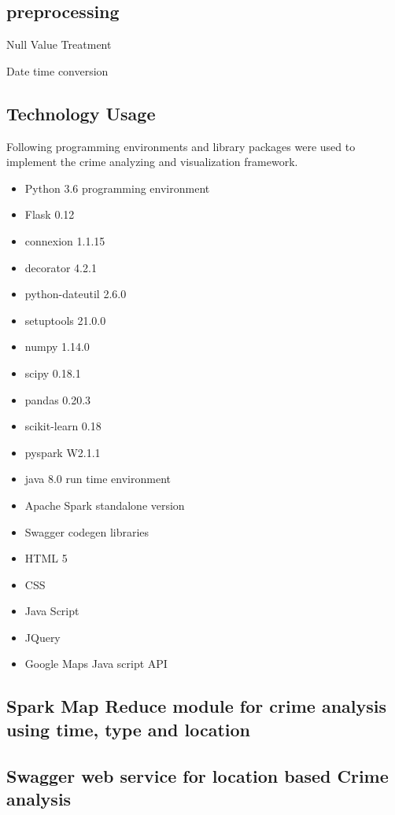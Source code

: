 \subsection{preprocessing}

Null Value Treatment

Date time conversion

\subsection{Technology Usage}
Following programming environments and library packages were  used to implement the crime analyzing and visualization framework. 
\begin{itemize}
	\item Python 3.6 programming environment
	\item Flask 0.12
	\item connexion 1.1.15
	\item decorator 4.2.1
	\item python-dateutil 2.6.0
	\item setuptools 21.0.0
	\item numpy 1.14.0
	\item scipy 0.18.1
	\item pandas 0.20.3
	\item scikit-learn 0.18
	\item pyspark W2.1.1
	\item java 8.0 run time environment
	\item Apache Spark standalone version
	\item Swagger codegen libraries
	\item HTML 5
	\item CSS
	\item Java Script
	\item JQuery
	\item Google Maps Java script API
\end{itemize}

\subsection{Spark Map Reduce module for crime analysis using time, type and location}

\subsection{Swagger web service for location based Crime analysis}

